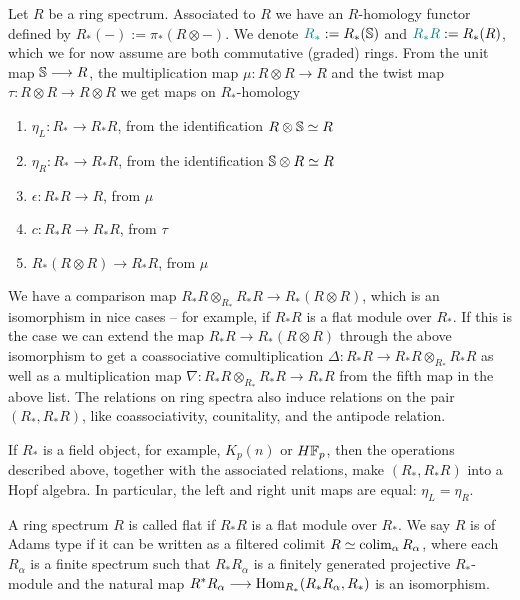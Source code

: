 \begin{construction}
    Let $R$ be a ring spectrum. Associated to $R$ we have an { $R$-homology} functor defined by $R_*(-):= \pi_*(R\otimes -)$. We denote ${\defn R_*}:=R_*(\S)$ and ${\defn R_*R}:= R_*(R)$, which we for now assume are both commutative (graded) rings. From the unit map $\S\longrightarrow R$, the multiplication map $\mu\colon R\otimes R\longrightarrow R$ and the twist map $\tau\colon R\otimes R\longrightarrow R\otimes R$ we get maps on $R_*$-homology
    \begin{enumerate}
        \item $\eta_L\colon R_*\longrightarrow R_*R$, from the identification $R\otimes \S\simeq R$
        \item $\eta_R\colon R_*\longrightarrow R_*R$, from the identification $\S\otimes R\simeq R$
        \item $\epsilon\colon R_*R\longrightarrow R$, from $\mu$
        \item $c\colon R_*R\longrightarrow R_*R$, from $\tau$
        \item $R_*(R\otimes R)\longrightarrow R_*R$, from $\mu$
    \end{enumerate}
    We have a comparison map $R_*R\otimes_{R_*}R_*R\longrightarrow R_*(R\otimes R)$, which is an isomorphism in nice cases -- for example, if $R_*R$ is a flat module over $R_*$. If this is the case we can extend the map $R_*R\longrightarrow R_*(R\otimes R)$ through the above isomorphism to get a coassociative comultiplication $\Delta\colon R_*R\longrightarrow R_*R\otimes_{R_*}R_*R$ as well as a multiplication map $\nabla\colon R_*R\otimes_{R_*}R_*R\longrightarrow R_*R$ from the fifth map in the above list. The relations on ring spectra also induce relations on the pair $(R_*, R_*R)$, like coassociativity, counitality, and the antipode relation.   
\end{construction}

\begin{remark}
    If $R_*$ is a field object, for example, $K_p(n)$ or $H\F_p$, then the operations described above, together with the associated relations, make $(R_*, R_*R)$ into a Hopf algebra. In particular, the left and right unit maps are equal: $\eta_L=\eta_R$. 
\end{remark}

\begin{definition}
    A ring spectrum $R$ is called { flat} if $R_*R$ is a flat module over $R_*$. We say $R$ is of { Adams type} if it can be written as a filtered colimit $R\simeq \colim_\alpha R_\alpha$, where each $R_\alpha$ is a finite spectrum such that $R_*R_\alpha$ is a finitely generated projective $R_*$-module and the natural map $R^*R_\alpha \longrightarrow \Hom_{R_*}(R_*R_\alpha, R_*)$ is an isomorphism.
\end{definition}

